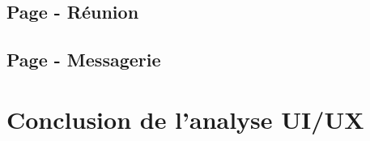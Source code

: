 \documentclass[12pt, a4paper, oneside]{Thesis}
\begin{document}
\subsection{Page - Réunion}

\subsection{Page - Messagerie}

\section{Conclusion de l'analyse UI/UX}
\end{document}
